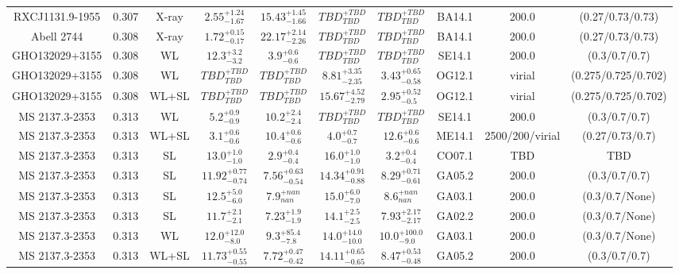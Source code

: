 \begin{table}
\begin{tabular}{cccccccccc}
RXCJ1131.9-1955 & 0.307 & X-ray & ${2.55}^{+1.24}_{-1.67}$ & ${15.43}^{+1.45}_{-1.66}$ & ${TBD}^{+TBD}_{TBD}$ & ${TBD}^{+TBD}_{TBD}$ & BA14.1 & 200.0 & (0.27/0.73/0.73) \\
Abell 2744 & 0.308 & X-ray & ${1.72}^{+0.15}_{-0.17}$ & ${22.17}^{+2.14}_{-2.26}$ & ${TBD}^{+TBD}_{TBD}$ & ${TBD}^{+TBD}_{TBD}$ & BA14.1 & 200.0 & (0.27/0.73/0.73) \\
GHO132029+3155 & 0.308 & WL & ${12.3}^{+3.2}_{-3.2}$ & ${3.9}^{+0.6}_{-0.6}$ & ${TBD}^{+TBD}_{TBD}$ & ${TBD}^{+TBD}_{TBD}$ & SE14.1 & 200.0 & (0.3/0.7/0.7) \\
GHO132029+3155 & 0.308 & WL & ${TBD}^{+TBD}_{TBD}$ & ${TBD}^{+TBD}_{TBD}$ & ${8.81}^{+3.35}_{-2.35}$ & ${3.43}^{+0.65}_{-0.58}$ & OG12.1 & virial & (0.275/0.725/0.702) \\
GHO132029+3155 & 0.308 & WL+SL & ${TBD}^{+TBD}_{TBD}$ & ${TBD}^{+TBD}_{TBD}$ & ${15.67}^{+4.52}_{-2.79}$ & ${2.95}^{+0.52}_{-0.5}$ & OG12.1 & virial & (0.275/0.725/0.702) \\
MS 2137.3-2353 & 0.313 & WL & ${5.2}^{+0.9}_{-0.9}$ & ${10.2}^{+2.4}_{-2.4}$ & ${TBD}^{+TBD}_{TBD}$ & ${TBD}^{+TBD}_{TBD}$ & SE14.1 & 200.0 & (0.3/0.7/0.7) \\
MS 2137.3-2353 & 0.313 & WL+SL & ${3.1}^{+0.6}_{-0.6}$ & ${10.4}^{+0.6}_{-0.6}$ & ${4.0}^{+0.7}_{-0.7}$ & ${12.6}^{+0.6}_{-0.6}$ & ME14.1 & 2500/200/virial & (0.27/0.73/0.7) \\
MS 2137.3-2353 & 0.313 & SL & ${13.0}^{+1.0}_{-1.0}$ & ${2.9}^{+0.4}_{-0.4}$ & ${16.0}^{+1.0}_{-1.0}$ & ${3.2}^{+0.4}_{-0.4}$ & CO07.1 & TBD & TBD \\
MS 2137.3-2353 & 0.313 & SL & ${11.92}^{+0.77}_{-0.74}$ & ${7.56}^{+0.63}_{-0.54}$ & ${14.34}^{+0.91}_{-0.88}$ & ${8.29}^{+0.71}_{-0.61}$ & GA05.2 & 200.0 & (0.3/0.7/0.7) \\
MS 2137.3-2353 & 0.313 & SL & ${12.5}^{+5.0}_{-6.0}$ & ${7.9}^{+nan}_{nan}$ & ${15.0}^{+6.0}_{-7.0}$ & ${8.6}^{+nan}_{nan}$ & GA03.1 & 200.0 & (0.3/0.7/None) \\
MS 2137.3-2353 & 0.313 & SL & ${11.7}^{+2.1}_{-2.1}$ & ${7.23}^{+1.9}_{-1.9}$ & ${14.1}^{+2.5}_{-2.5}$ & ${7.93}^{+2.17}_{-2.17}$ & GA02.2 & 200.0 & (0.3/0.7/None) \\
MS 2137.3-2353 & 0.313 & WL & ${12.0}^{+12.0}_{-8.0}$ & ${9.3}^{+85.4}_{-7.8}$ & ${14.0}^{+14.0}_{-10.0}$ & ${10.0}^{+100.0}_{-9.0}$ & GA03.1 & 200.0 & (0.3/0.7/None) \\
MS 2137.3-2353 & 0.313 & WL+SL & ${11.73}^{+0.55}_{-0.55}$ & ${7.72}^{+0.47}_{-0.42}$ & ${14.11}^{+0.65}_{-0.65}$ & ${8.47}^{+0.53}_{-0.48}$ & GA05.2 & 200.0 & (0.3/0.7/0.7) \\

\end{tabular}
\end{table}
